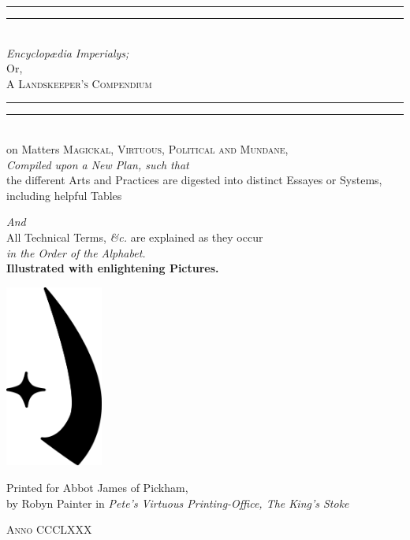 \documentclass[twoside,11pt,b5paper]{scrbook}
\begin{document}
\begin{titlepage}
 \centering
 \vspace*{\baselineskip}
 \rule{\textwidth}{1.6pt}\vspace*{-\baselineskip}\vspace*{2pt}
 \rule{\textwidth}{0.4pt}\\[\baselineskip]
 
 {\Huge \itshape Encyclopædia Imperialys;}\\[0.4em]
 {\Large Or,\\[0.4em]}
 {\huge\scshape A Landskeeper's Compendium}\\
 \rule{\textwidth}{0.4pt}\vspace*{-\baselineskip}\vspace{3.2pt}
 \rule{\textwidth}{1.6pt}\\[\baselineskip]
 {\Large on Matters \scshape Magickal, Virtuous, Political {\normalfont and} Mundane,\\[0.9em]}
 {\itshape Compiled upon a New Plan, such that\\[0.5em]}
 {\large the different Arts and Practices are digested into distinct Essayes or Systems, including helpful Tables}
 
 {\itshape And\\[0.5em]}
 {\large All Technical Terms, \textit{\&c.} are explained as they occur \\[0.5em] \itshape in the Order of the Alphabet.}
 \\[0.9em]
 {\bfseries Illustrated with enlightening Pictures.}
 
 \vfill
 
 \includegraphics[height=6cm]{encyclopedia/Sular.pdf}

 \vfill

 Printed for Abbot James of Pickham,\\[0.4em]
 by Robyn Painter in {\itshape Pete’s Virtuous Printing-Office, The King's Stoke}
 
 {\scshape Anno CCCLXXX}
\end{titlepage}
\end{document}
